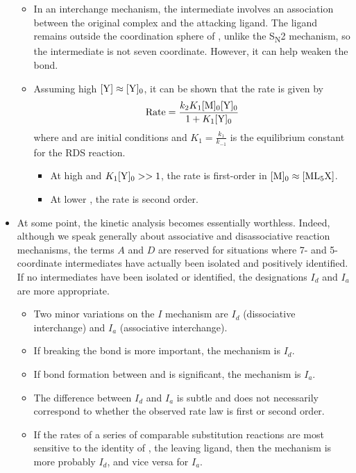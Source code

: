 \documentclass[../notes.tex]{subfiles}
\begin{document}
\begin{itemize}
\begin{itemize}
        \item In an interchange mechanism, the intermediate involves an association between the original  complex and the attacking  ligand. The  ligand remains outside the coordination sphere of , unlike the S\textsubscript{N}2 mechanism, so the intermediate is not seven coordinate. However, it can help weaken the  bond.
        \item Assuming high $\ce{[Y]}\approx\ce{[Y]_0}$, it can be shown that the rate is given by
        \begin{equation*}
            \text{Rate} = \frac{k_2K_1\ce{[M]_0[Y]_0}}{1+K_1\ce{[Y]_0}}
        \end{equation*}
        where  and  are initial conditions and $K_1=\frac{k_1}{k_{-1}}$ is the equilibrium constant for the RDS reaction.
        \begin{itemize}
            \item At high \ce{[Y]} and $K_1\ce{[Y]_0}>>1$, the rate is first-order in $\ce{[M]_0}\approx\ce{[ML5X]}$.
            \item At lower \ce{[Y]}, the rate is second order.
        \end{itemize}
    \end{itemize}
    \item At some point, the kinetic analysis becomes essentially worthless. Indeed, although we speak generally about associative and disassociative reaction mechanisms, the terms $A$ and $D$ are reserved for situations where 7- and 5-coordinate intermediates have actually been isolated and positively identified. If no intermediates have been isolated or identified, the designations $I_d$ and $I_a$ are more appropriate.
    \begin{itemize}
        \item Two minor variations on the $I$ mechanism are $I_d$ (dissociative interchange) and $I_a$ (associative interchange).
        \item If breaking the  bond is more important, the mechanism is $I_d$.
        \item If bond formation between  and  is significant, the mechanism is $I_a$.
        \item The difference between $I_d$ and $I_a$ is subtle and does not necessarily correspond to whether the observed rate law is first or second order.
        \item If the rates of a series of comparable substitution reactions are most sensitive to the identity of , the leaving ligand, then the mechanism is more probably $I_d$, and vice versa for $I_a$.

\end{itemize}
\end{itemize}
\end{document}
